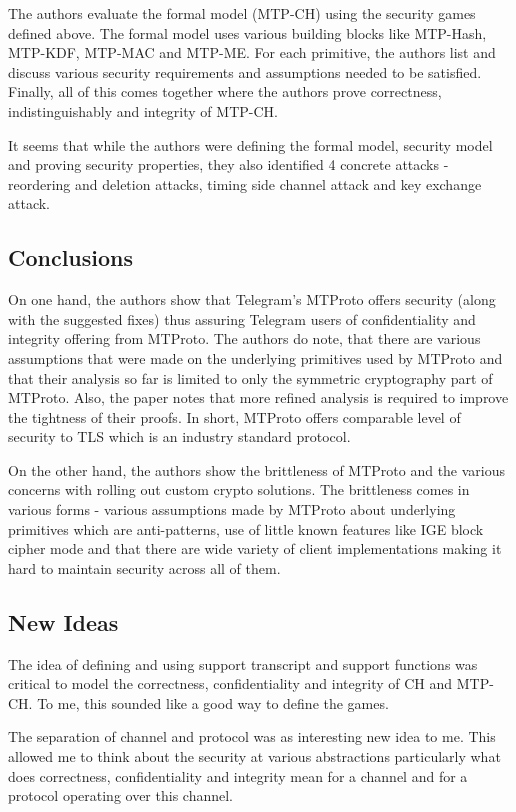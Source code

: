 \documentclass[12pt]{article}
\begin{document}
    The authors evaluate the formal model (MTP-CH) using the security games defined above. The formal model uses various building blocks like MTP-Hash, MTP-KDF, MTP-MAC and MTP-ME. For each primitive, the authors list and discuss various security requirements and assumptions needed to be satisfied. Finally, all of this comes together where the authors prove correctness, indistinguishably and integrity of MTP-CH.

    It seems that while the authors were defining the formal model, security model and proving security properties, they also identified 4 concrete attacks - reordering and deletion attacks, timing side channel attack and key exchange attack.
    
    \subsection*{Conclusions}
    On one hand, the authors show that Telegram's MTProto offers security (along with the suggested fixes) thus assuring Telegram users of confidentiality and integrity offering from MTProto. The authors do note, that there are various assumptions that were made on the underlying primitives used by MTProto and that their analysis so far is limited to only the symmetric cryptography part of MTProto. Also, the paper notes that more refined analysis is required to improve the tightness of their proofs. In short, MTProto offers comparable level of security to TLS which is an industry standard protocol.

    On the other hand, the authors show the brittleness of MTProto and the various concerns with rolling out custom crypto solutions. The brittleness comes in various forms - various assumptions made by MTProto about underlying primitives which are anti-patterns, use of little known features like IGE block cipher mode and that there are wide variety of client implementations making it hard to maintain security across all of them.

    \subsection*{New Ideas}
    The idea of defining and using support transcript and support functions was critical to model the correctness, confidentiality and integrity of CH and MTP-CH. To me, this sounded like a good way to define the games.

    The separation of channel and protocol was as interesting new idea to me. This allowed me to think about the security at various abstractions particularly what does correctness, confidentiality and integrity mean for a channel and for a protocol operating over this channel.
\end{document}
